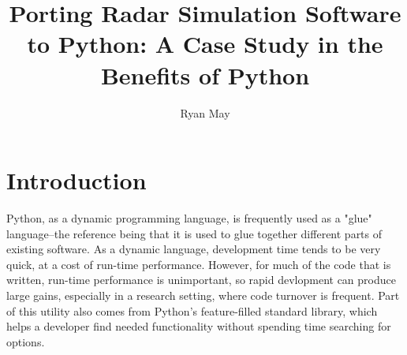 \documentclass[twocolumn]{article}
\title{Porting Radar Simulation Software to Python: A Case Study in the Benefits of Python}
\author{Ryan May}
\affil{Enterprise Electronics Corporation\\Norman, OK}
\date{}
\begin{document}
\maketitle



\section{Introduction}
Python, as a dynamic programming language, is frequently used as a "glue" language--the reference
being that it is used to glue together different parts of existing software. As a dynamic language,
development time tends to be very quick, at a cost of run-time performance. However, for much of
the code that is written, run-time performance is unimportant, so rapid devlopment can produce
large gains, especially in a research setting, where code turnover is frequent. Part of this utility
also comes from Python's feature-filled standard library, which helps a developer find needed
functionality without spending time searching for options.
\end{document}

